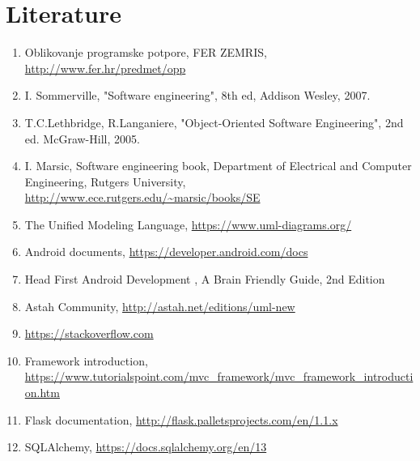 \chapter*{Literature}
		
		\begin{enumerate}
			
			
			\item  Oblikovanje programske potpore, FER ZEMRIS, \url{http://www.fer.hr/predmet/opp}
			
			\item  I. Sommerville, "Software engineering", 8th ed, Addison Wesley, 2007.
			
			\item  T.C.Lethbridge, R.Langaniere, "Object-Oriented Software Engineering", 2nd ed. McGraw-Hill, 2005.
			
			\item  I. Marsic, Software engineering book, Department of Electrical and Computer Engineering, Rutgers University, \url{http://www.ece.rutgers.edu/~marsic/books/SE}
			
			\item  The Unified Modeling Language, \url{https://www.uml-diagrams.org/}
			
			\item  Android documents, \url{https://developer.android.com/docs}
			
			\item Head First Android Development , A Brain Friendly Guide, 2nd Edition

			\item Astah Community, \url{http://astah.net/editions/uml-new}

			\item \url{https://stackoverflow.com}

			\item Framework introduction, \url{https://www.tutorialspoint.com/mvc_framework/mvc_framework_introduction.htm}

			\item Flask documentation, \url{http://flask.palletsprojects.com/en/1.1.x}

			\item SQLAlchemy, \url{https://docs.sqlalchemy.org/en/13}

		\end{enumerate}

		
		 